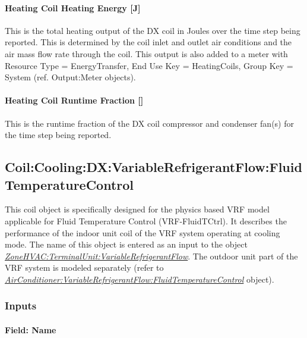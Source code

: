 \paragraph{Heating Coil Heating Energy {[}J{]}}\label{heating-coil-heating-energy-j-4}

This is the total heating output of the DX coil in Joules over the time step being reported. This is determined by the coil inlet and outlet air conditions and the air mass flow rate through the coil. This output is also added to a meter with Resource Type = EnergyTransfer, End Use Key = HeatingCoils, Group Key = System (ref. Output:Meter objects).

\paragraph{Heating Coil Runtime Fraction {[]}}\label{heating-coil-runtime-fraction-1}

This is the runtime fraction of the DX coil compressor and condenser fan(s) for the time step being reported.

\subsection{Coil:Cooling:DX:VariableRefrigerantFlow:FluidTemperatureControl}\label{coilcoolingdxvariablerefrigerantflowfluidtemperaturecontrol}

This coil object is specifically designed for the physics based VRF model applicable for Fluid Temperature Control (VRF-FluidTCtrl). It describes the performance of the indoor unit coil of the VRF system operating at cooling mode. The name of this object is entered as an input to the object \emph{\hyperref[zonehvacterminalunitvariablerefrigerantflow]{ZoneHVAC:TerminalUnit:VariableRefrigerantFlow}}. The outdoor unit part of the VRF system is modeled separately (refer to \emph{\hyperref[airconditionervariablerefrigerantflowfluidtemperaturecontrol]{AirConditioner:VariableRefrigerantFlow:FluidTemperatureControl}} object).

\subsubsection{Inputs}\label{inputs-8-008}

\paragraph{Field: Name}\label{field-name-7-006}

